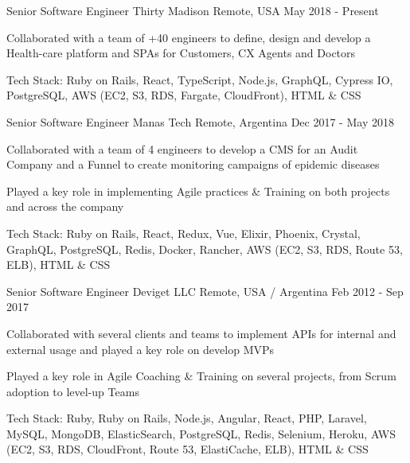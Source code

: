 
\begin{cventries}

  \cventry
    {Senior Software Engineer}
    {Thirty Madison}
    {Remote, USA}
    {May 2018 - Present}
    {
      \begin{cvitems}
        \item {Collaborated with a team of +40 engineers to define, design and develop a Health-care platform and SPAs for Customers, CX Agents and Doctors}
        \item {Tech Stack: Ruby on Rails, React, TypeScript, Node.js, GraphQL, Cypress IO, PostgreSQL, AWS (EC2, S3, RDS, Fargate, CloudFront), HTML \& CSS}
      \end{cvitems}
    }

  \cventry
    {Senior Software Engineer}
    {Manas Tech}
    {Remote, Argentina}
    {Dec 2017 - May 2018}
    {
      \begin{cvitems}
        \item {Collaborated with a team of 4 engineers to develop a CMS for an Audit Company and a Funnel to create monitoring campaigns of epidemic diseases}
        \item {Played a key role in implementing Agile practices \& Training on both projects and across the company}
        \item {Tech Stack: Ruby on Rails, React, Redux, Vue, Elixir, Phoenix, Crystal, GraphQL, PostgreSQL, Redis, Docker, Rancher, AWS (EC2, S3, RDS, Route 53, ELB), HTML \& CSS}
      \end{cvitems}
    }

  \cventry
    {Senior Software Engineer}
    {Deviget LLC}
    {Remote, USA / Argentina}
    {Feb 2012 - Sep 2017}
    {
      \begin{cvitems}
        \item {Collaborated with several clients and teams to implement APIs for internal and external usage and played a key role on develop MVPs}
        \item {Played a key role in Agile Coaching \& Training on several projects, from Scrum adoption to level-up Teams}
        \item {Tech Stack: Ruby, Ruby on Rails, Node.js, Angular, React, PHP, Laravel, MySQL, MongoDB, ElasticSearch, PostgreSQL, Redis, Selenium, Heroku, AWS (EC2, S3, RDS, CloudFront, Route 53, ElastiCache, ELB), HTML \& CSS}
      \end{cvitems}
    }


\end{cventries}

